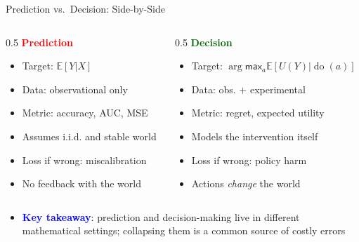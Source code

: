 \documentclass[
  10pt,
  ignorenonframetext,
]{beamer}
\providecommand{\tightlist}{%
  \setlength{\itemsep}{0pt}\setlength{\parskip}{0pt}}
\newcommand{\EE}{\mathbb{E}}
\def\max{\textsf{max}}
\begin{document}
\begin{frame}{Prediction vs.~Decision: Side-by-Side}
\label{prediction-vs.-decision-side-by-side}
\begin{columns}[T]
\begin{column}{0.5\textwidth}
\textbf{\textcolor{red}{Prediction}}

\begin{itemize}
\tightlist
\item
  Target: \(\EE[Y | X]\)
\item
  Data: observational only
\item
  Metric: accuracy, AUC, MSE
\item
  Assumes i.i.d. and stable world
\item
  Loss if wrong: miscalibration
\item
  No feedback with the world
\end{itemize}
\end{column}

\begin{column}{0.5\textwidth}
\textbf{\textcolor{darkgreen}{Decision}}

\begin{itemize}
\tightlist
\item
  Target: \(\arg\max_a \EE[U(Y) | \operatorname{do}(a)]\)
\item
  Data: obs. \(+\) experimental
\item
  Metric: regret, expected utility
\item
  Models the intervention itself
\item
  Loss if wrong: policy harm
\item
  Actions \emph{change} the world
\end{itemize}
\end{column}
\end{columns}

\begin{itemize}
\tightlist
\item
  \textbf{\textcolor{blue}{Key takeaway}}: prediction and
  decision-making live in different mathematical settings; collapsing
  them is a common source of costly errors
\end{itemize}
\end{frame}
\end{document}
